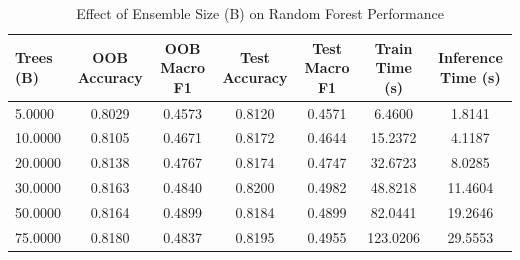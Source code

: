 \begin{table}[htbp]
\centering
\caption{Effect of Ensemble Size (B) on Random Forest Performance}
\label{tab:ensemble_size_convergence}
\begin{tabular}{lcccccc}
\toprule
Trees (B) & OOB Accuracy & OOB Macro F1 & Test Accuracy & Test Macro F1 & Train Time (s) & Inference Time (s) \\
\midrule
5.0000 & 0.8029 & 0.4573 & 0.8120 & 0.4571 & 6.4600 & 1.8141 \\
10.0000 & 0.8105 & 0.4671 & 0.8172 & 0.4644 & 15.2372 & 4.1187 \\
20.0000 & 0.8138 & 0.4767 & 0.8174 & 0.4747 & 32.6723 & 8.0285 \\
30.0000 & 0.8163 & 0.4840 & 0.8200 & 0.4982 & 48.8218 & 11.4604 \\
50.0000 & 0.8164 & 0.4899 & 0.8184 & 0.4899 & 82.0441 & 19.2646 \\
75.0000 & 0.8180 & 0.4837 & 0.8195 & 0.4955 & 123.0206 & 29.5553 \\
\bottomrule
\end{tabular}
\end{table}
